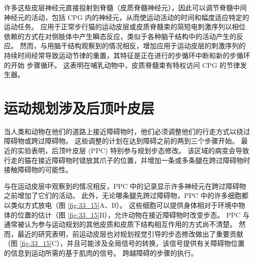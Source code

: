 许多这些皮层神经元直接投射到脊髓（皮质脊髓神经元），因此可以调节脊髓中间神经元的活动，包括 CPG 内的神经元，从而使运动活动的时间和幅度适应特定的运动任务。
应用于正常步行猫的运动皮层或皮质脊髓束的简短电刺激序列以相位依赖的方式在对侧肢体中产生瞬态反应，类似于各种脑干结构中的活动产生的反应。
然而，与用脑干结构观察到的情况相反，增加应用于运动皮层的刺激序列的持续时间经常导致运动节律的重置，其特征是正在进行的步循环中断和新的步循环的开始 步骤循环。
这表明在哺乳动物中，皮质脊髓束有特权访问 CPG 的节律发生器。


\section{运动规划涉及后顶叶皮层}

当人类和动物在他们的道路上接近障碍物时，他们必须调整他们的行走方式以绕过障碍物或跨过障碍物。
这些调整的计划在达到障碍之前的两到三个步骤开始。
最近的实验表明，后顶叶皮层 (PPC) 特别参与规划步态修改。
该区域的病变会导致行走的猫在接近障碍物时错放其爪子的位置，并增加一条或多条腿在跨过障碍物时接触障碍物的可能性。


与在运动皮层中观察到的情况相反，PPC 中的记录显示许多神经元在跨过障碍物之前增加了它们的活动。
此外，无论哪条腿先跨过障碍物，PPC 中的许多细胞都以类似方式放电（图 \ref{fig:33_15}A、B）。
这些细胞可以提供身体相对于环境中物体的位置的估计（图 \ref{fig:33_15}B），允许动物在接近障碍物时改变步态。
PPC 与通常被认为参与运动规划的其他皮质和皮质下结构相互作用的方式尚不清楚。
然而，最近的研究表明，前运动皮层也对规划视觉引导的步态修改做出了重要贡献（图 \ref{fig:33_15}C），并且可能涉及全局信号的转换，该信号提供有关障碍物位置的信息到运动所需的基于肌肉的信号。
跨越障碍的步骤的执行。


